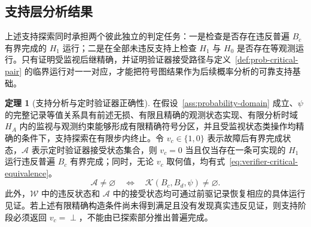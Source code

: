 \documentclass[master,fontset=ubuntu]{shnuthesis}
\theoremstyle{definition}
\newtheorem{thesistheorem}{定理}
\begin{document}
\subsection{支持层分析结果}

上述支持探索同时承担两个彼此独立的判定任务：一是检查是否存在违反普遍 \(B_c\) 有界完成的 \(H_1\) 运行；二是在全部未违反支持上检查 \(H_1\) 与 \(H_0\) 是否存在等观测运行。只有证明受监视后继精确，并证明验证器接受路径与定义~\ref{def:prob-critical-pair} 的临界运行对一一对应，才能把符号图结果作为后续概率分析的可靠支持基础。

\begin{thesistheorem}[支持分析与定时验证器正确性]
\label{thm:support-verifier-correctness}
在假设~\ref{ass:probability-domain} 成立、\(\psi\) 的完整记录等值关系具有前述无损、有限且精确的观测状态实现、有限分析时域 \(H_A\) 内的监视与观测约束能够形成有限精确符号分区，并且受监视状态类操作均精确的条件下，支持探索在有限步内终止。令 \(v_c\in\{1,0\}\) 表示故障后有界完成状态，\(\mathcal A\) 表示定时验证器接受状态集合，则 \(v_c=0\) 当且仅当存在一条可实现的 \(H_1\) 运行违反普遍 \(B_c\) 有界完成；同时，无论 \(v_c\) 取何值，均有式~\eqref{eq:verifier-critical-equivalence}。
\begin{equation}
\mathcal A\neq\varnothing
\quad\Longleftrightarrow\quad
\mathcal K(B_c,B_d,\psi)\neq\varnothing.
\label{eq:verifier-critical-equivalence}
\end{equation}
此外，\(\mathcal W\) 中的违反状态和 \(\mathcal A\) 中的接受状态均可通过前驱记录恢复相应的具体运行见证。若上述有限精确构造条件尚未得到满足且没有发现真实违反见证，则支持阶段必须返回 \(v_c=\perp\)，不能由已探索部分推出普遍完成。
\end{thesistheorem}
\end{document}
